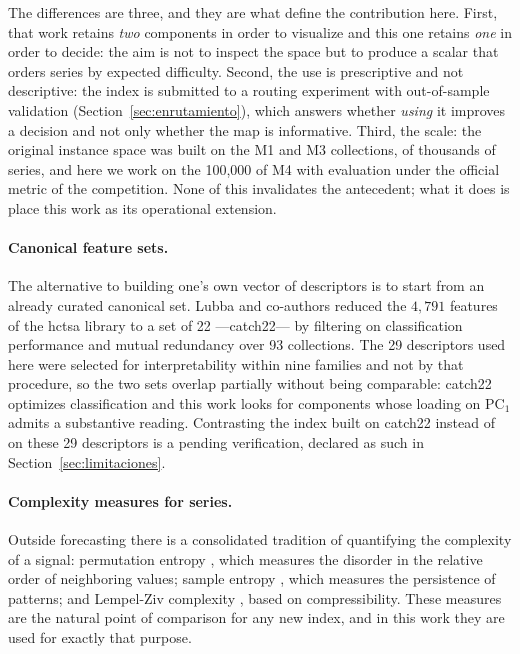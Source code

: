 The differences are three, and they are what define the contribution here. First, that
work retains \emph{two} components in order to visualize and this one retains \emph{one}
in order to decide: the aim is not to inspect the space but to produce a scalar that
orders series by expected difficulty. Second, the use is prescriptive and not descriptive:
the index is submitted to a routing experiment with out-of-sample validation
(Section~\ref{sec:enrutamiento}), which answers whether \emph{using} it improves a
decision and not only whether the map is informative. Third, the scale: the original
instance space was built on the M1 and M3 collections, of thousands of series, and here we
work on the 100{,}000 of M4 with evaluation under the official metric of the competition.
None of this invalidates the antecedent; what it does is place this work as its
operational extension.

\paragraph{Canonical feature sets.} The alternative to building one's own vector of
descriptors is to start from an already curated canonical set. Lubba and co-authors
\cite{lubba2019} reduced the $4{,}791$ features of the hctsa library \cite{fulcher2017} to
a set of 22 ---catch22--- by filtering on classification performance and mutual redundancy
over 93 collections. The 29 descriptors used here were selected for interpretability
within nine families and not by that procedure, so the two sets overlap partially without
being comparable: catch22 optimizes classification and this work looks for components
whose loading on $\mathrm{PC}_1$ admits a substantive reading. Contrasting the index built
on catch22 instead of on these 29 descriptors is a pending verification, declared as such
in Section~\ref{sec:limitaciones}.

\paragraph{Complexity measures for series.} Outside forecasting there is a consolidated
tradition of quantifying the complexity of a signal: permutation entropy
\cite{bandt2002}, which measures the disorder in the relative order of neighboring values;
sample entropy \cite{richman2000}, which measures the persistence of patterns; and
Lempel-Ziv complexity \cite{lempel1976}, based on compressibility. These measures are the
natural point of comparison for any new index, and in this work they are used for exactly
that purpose.

